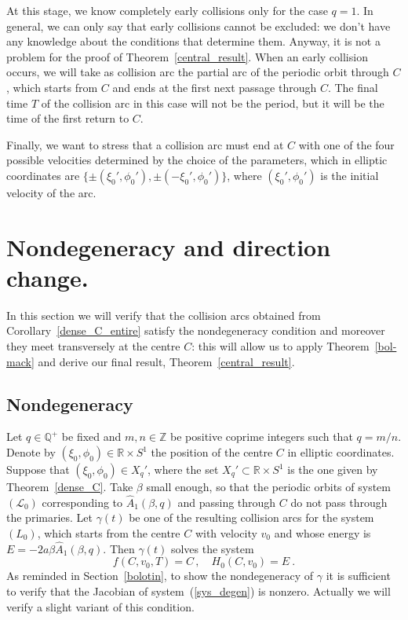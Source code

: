 \documentclass[a4paper]{article}
\begin{document}
At this stage, we know completely early collisions only for the case
$q=1$.  In general, we can only say that early collisions cannot be
excluded: we don't have any knowledge about the conditions that
determine them.  Anyway, it is not a problem for the proof of
Theorem~\ref{central_result}.  When an early collision occurs, we will
take as collision arc the partial arc of the periodic orbit through
$C$, which starts from $C$ and ends at the first next passage through
$C$.  The final time $T$ of the collision arc in this case will not be
the period, but it will be the time of the first return to $C$.

Finally, we want to stress that a collision arc must end at $C$ with one 
of the four possible velocities determined by the choice of the parameters,
which in elliptic coordinates are 
$\{\pm (\xi_0',\phi_0'),\pm (-\xi_0',\phi_0')\}$,
where $(\xi_0',\phi_0')$ is the initial velocity of the arc.

\section{Nondegeneracy and direction change.}
\label{degen_dir_change}
In this section we will verify that the collision arcs obtained from 
Corollary~\ref{dense_C_entire} satisfy the nondegeneracy condition and 
moreover they meet transversely at the centre $C$: this will allow us to 
apply Theorem~\ref{bol-mack} and derive our final result, 
Theorem~\ref{central_result}.  

\subsection{Nondegeneracy}
\label{nondegen}
Let $q \in {\mathbb{Q}}^+$ be fixed and $m,n \in {\mathbb{Z}}$ be positive coprime
integers such that $q=m/n$.  Denote by $(\xi_0,\phi_0) \in {\mathbb{R}}\times
S^1$ the position of the centre $C$ in elliptic coordinates.  Suppose
that $(\xi_0,\phi_0) \in X_q'$, where the set $X_q' \subset {\mathbb{R}} \times
S^1$ is the one given by Theorem~\ref{dense_C}. Take $\beta$ small
enough, so that the periodic orbits of system $(\mathcal{L}_0)$
corresponding to $\hat{A}_1(\beta,q)$ and passing through $C$ do not
pass through the primaries.  Let $\gamma(t)$ be one of the resulting
collision arcs for the system $(L_0)$, which starts from the centre
$C$ with velocity $v_0$ and whose energy is $E=-2a \beta
\hat{A}_1(\beta,q)$. Then $\gamma(t)$ solves the system
\begin{equation}
\label{sys_degen}
f(C,v_0,T)=C\,, \quad H_0(C,v_0)=E\ .
\end{equation}
 As reminded in Section~\ref{bolotin}, to show the nondegeneracy of
 $\gamma$ it is sufficient to verify that the Jacobian of
 system~(\ref{sys_degen}) is nonzero. Actually we will verify a slight
 variant of this condition.
\end{document}
